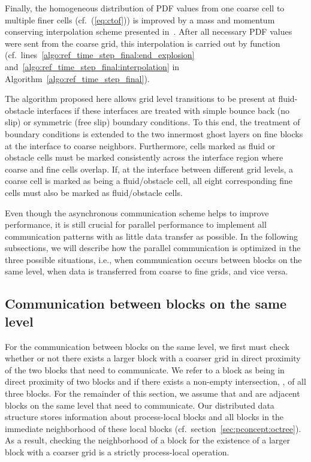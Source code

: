 \documentclass[final,leqno,onefignum,onetabnum]{siamltex1213}
\begin{document}
Finally, the homogeneous distribution of PDF values from one coarse cell to multiple finer cells (cf.~(\ref{eq:ctof})) is improved by a mass and momentum conserving interpolation scheme presented in~\cite{Chen2006}.
After all necessary PDF values were sent from the coarse grid, this interpolation is carried out by function  (cf.\ lines~\ref{algo:ref_time_step_final:end_explosion} and~\ref{algo:ref_time_step_final:interpolation} in Algorithm~\ref{algo:ref_time_step_final}).

The algorithm proposed here allows grid level transitions to be present at fluid-obstacle interfaces if these interfaces are treated with simple bounce back (no slip) or symmetric (free slip) boundary conditions.
To this end, the treatment of boundary conditions is extended to the two innermost ghost layers on fine blocks at the interface to coarse neighbors.
Furthermore, cells marked as fluid or obstacle cells must be marked consistently across the interface region where coarse and fine cells overlap.
If, at the interface between different grid levels, a coarse cell is marked as being a fluid/obstacle cell, all eight corresponding fine cells must also be marked as fluid/obstacle cells.

Even though the asynchronous communication scheme
helps to improve performance, it is still crucial for parallel performance to implement all communication patterns with as little data transfer as possible.
In the following subsections, we will describe how the parallel communication is optimized in the three possible situations, i.e.,
when communication occurs between blocks on the same level, when data is transferred from coarse to fine grids, and vice versa.

\subsection{Communication between blocks on the same level}\label{sec:lbmref:equal}

For the communication between blocks on the same level, we first must check whether or not there exists a larger block with a coarser grid in direct proximity of the two blocks that need to communicate.
We refer to a block  as being in direct proximity of two blocks  and  if there exists a non-empty intersection, , of all three blocks.
For the remainder of this section, we assume that  and  are adjacent blocks on the same level that need to communicate.
Our distributed data structure stores information about process-local blocks and all blocks in the immediate neighborhood of these local blocks (cf.\ section~\ref{sec:pconcept:octree}).
As a result, checking the neighborhood of a block for the existence of a larger block with a coarser grid is a strictly process-local operation.
\end{document}
